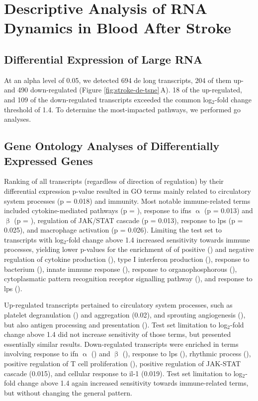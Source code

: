 \section{Descriptive Analysis of RNA Dynamics in Blood After Stroke}

\subsection{Differential Expression of Large RNA}
At an alpha level of 0.05, we detected 694 \acf{de} long transcripts, 204 of them up- and 490 down-regulated (Figure \ref{fig:stroke-de-tsne}\,A). 18 of the up-regulated, and 109 of the down-regulated transcripts exceeded the common log$_2$-fold change threshold of 1.4. To determine the most-impacted pathways, we performed \ac{go} analyses.

\subsection{Gene Ontology Analyses of Differentially Expressed Genes}
Ranking of all transcripts (regardless of direction of regulation) by their differential expression p-value resulted in GO terms mainly related to circulatory system processes (p = 0.018) and immunity. Most notable immune-related terms included cytokine-mediated pathways (p = ), response to \acp{ifn} $\upalpha$ (p = 0.013) and $\upbeta$ (p = ), regulation of JAK/STAT cascade (p = 0.013), response to \ac{lps} (p = 0.025), and macrophage activation (p = 0.026). Limiting the test set to transcripts with log$_2$-fold change above 1.4\,\,increased sensitivity towards immune processes, yielding lower p-values for the enrichment of of positive () and negative regulation of cytokine production (), type I interferon production (), response to bacterium (), innate immune response (), response to organophosphorous (), cytoplasmatic pattern recognition receptor signalling pathway (), and response to \ac{lps} ().

Up-regulated transcripts pertained to circulatory system processes, such as platelet degranulation () and aggregation (0.02), and sprouting angiogenesis (), but also antigen processing and presentation (). Test set limitation to log$_2$-fold change above 1.4 did not increase sensitivity of those terms, but presented essentially similar results. Down-regulated transcripts were enriched in terms involving response to \ac{ifn} $\upalpha$ () and $\upbeta$ (), response to \ac{lps} (), rhythmic process (), positive regulation of T cell proliferation (), positive regulation of JAK-STAT cascade (0.015), and cellular response to \ac{il}-1 (0.019). Test set limitation to log$_2$-fold change above 1.4 again increased sensitivity towards immune-related terms, but without changing the general pattern.

